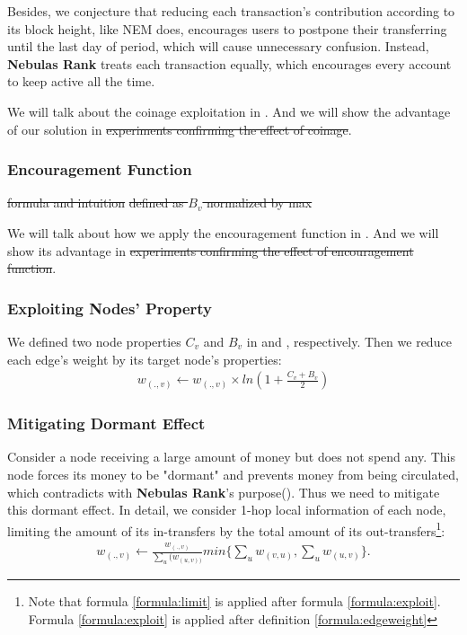 Besides, we conjecture that reducing each transaction's contribution according to its block height, like NEM does\cite{nem}, encourages users to postpone their transferring until the last day of period, which will cause unnecessary confusion. Instead, \textbf{Nebulas Rank} treats each transaction equally, which encourages every account to keep active all the time.

We will talk about the coinage exploitation in . And we will show the advantage of our solution in  \st{experiments confirming the effect of coinage}.


\subsubsection{Encouragement Function}\label{subsec:encouragement}
\st{formula and intuition} \st{defined as $B_v$ normalized by max}

We will talk about how we apply the encouragement function in . And we will show its advantage in  \st{experiments confirming the effect of encouragement function}.

\subsubsection{Exploiting Nodes' Property} \label{subsec:reduction}
We defined two node properties $C_v$ and $B_v$ in  and , respectively. Then we reduce each edge's weight by its target node's properties:
\begin{align}\label{formula:exploit}
	w_{(.,v)} \leftarrow w_{(.,v)} \times ln(1 + \frac{C_v + B_v}{2})
\end{align}

\subsubsection{Mitigating Dormant Effect} \label{subsec:limit}
Consider a node receiving a large amount of money but does not spend any. This node forces its money to be "dormant" and prevents money from being circulated, which contradicts with \textbf{Nebulas Rank}'s purpose(). Thus we need to mitigate this dormant effect. In detail, we consider 1-hop local information of each node, limiting the amount of its in-transfers by the total amount of its out-transfers\footnote{Note that formula \ref{formula:limit} is applied after formula \ref{formula:exploit}. Formula  \ref{formula:exploit} is applied after definition \ref{formula:edgeweight}}:
\begin{align}
\label{formula:limit}
w_{(.,v)} \leftarrow  \frac{w_{(.,v)}}{\sum_u(w_{(u,v))}} min\{ \sum_u{w_{(v,u)}}, \sum_u{w_{(u,v)}} \}.
\end{align}

